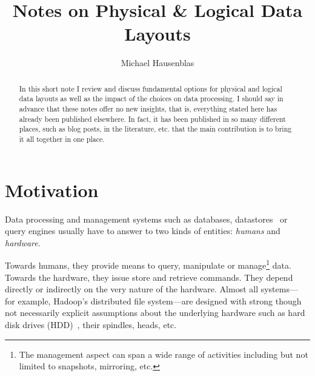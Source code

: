 \documentclass{llncs}
\begin{document}
\title{Notes on Physical \& Logical Data Layouts}
	\author{
	Michael Hausenblas 
	}
\maketitle

\begin{abstract}
In this short note I review and discuss fundamental options for physical and
logical data layouts as well as the impact of the choices on data processing.
I should say in advance that these notes offer no new insights, that is, 
everything stated here has already been published elsewhere. In fact, it has
been published in so many different places, such as blog posts, in the 
literature, etc. that the main contribution is to bring it all together in one
place.
\end{abstract}

\pagestyle{plain}

\section{Motivation}
\label{sec:mot}
Data processing and management systems such as databases, 
datastores~\cite{Cattell:SIGMOD11} or query engines usually have to answer 
to two kinds of entities: \emph{humans} and \emph{hardware}. 

Towards humans, they provide means to query, manipulate or 
manage\footnote{The management aspect can span a wide range of activities 
including but not limited to snapshots, mirroring, etc.} data.
Towards the hardware, they issue store and retrieve commands. They depend 
directly or indirectly on the very nature of the hardware. Almost all systems---
for example, Hadoop's distributed file system---are designed with strong though
not necessarily explicit assumptions about the underlying hardware such as hard 
disk drives (HDD)~\cite{Elerath:ACMQ1}, their spindles, heads, etc.
\end{document}
